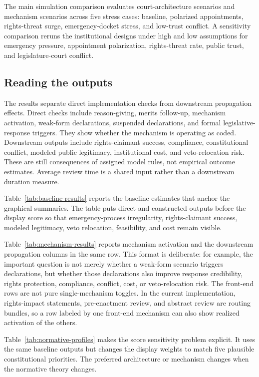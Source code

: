 \documentclass[
  journal=small,
  manuscript=research-article,
  year=2026
]{cup-journal}
\begin{document}
The main simulation comparison evaluates court-architecture scenarios and mechanism scenarios across five stress cases: baseline, polarized appointments, rights-threat surge, emergency-docket stress, and low-trust conflict. A sensitivity comparison reruns the institutional designs under high and low assumptions for emergency pressure, appointment polarization, rights-threat rate, public trust, and legislature-court conflict.

\subsection{Reading the outputs}

The results separate direct implementation checks from downstream propagation effects. Direct checks include reason-giving, merits follow-up, mechanism activation, weak-form declarations, suspended declarations, and formal legislative-response triggers. They show whether the mechanism is operating as coded. Downstream outputs include rights-claimant success, compliance, constitutional conflict, modeled public legitimacy, institutional cost, and veto-relocation risk. These are still consequences of assigned model rules, not empirical outcome estimates. Average review time is a shared input rather than a downstream duration measure.

Table~\ref{tab:baseline-results} reports the baseline estimates that anchor the graphical summaries. The table puts direct and constructed outputs before the display score so that emergency-process irregularity, rights-claimant success, modeled legitimacy, veto relocation, feasibility, and cost remain visible.



Table~\ref{tab:mechanism-results} reports mechanism activation and the downstream propagation columns in the same row. This format is deliberate: for example, the important question is not merely whether a weak-form scenario triggers declarations, but whether those declarations also improve response credibility, rights protection, compliance, conflict, cost, or veto-relocation risk. The front-end rows are not pure single-mechanism toggles. In the current implementation, rights-impact statements, pre-enactment review, and abstract review are routing bundles, so a row labeled by one front-end mechanism can also show realized activation of the others.



Table~\ref{tab:normative-profiles} makes the score sensitivity problem explicit. It uses the same baseline outputs but changes the display weights to match five plausible constitutional priorities. The preferred architecture or mechanism changes when the normative theory changes.
\end{document}
